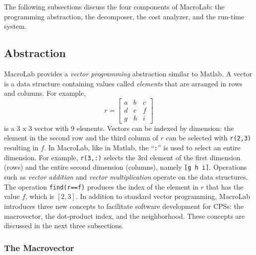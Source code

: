 The following subsections discuss the four components of MacroLab: the
programming abstraction, the decomposer, the cost analyzer, and the run-time
system.

\subsection{Abstraction} \label{sect:abstraction}

MacroLab provides a {\em vector programming} abstraction similar to Matlab. A
vector is a data structure containing values called {\em elements}
that are arranged in rows and columns.  For example,
\[ r = \left[ \begin{array}{ccc} a & b & c \\ d & e & f \\ g & h & i \end{array}
\right]\] is a 3 x 3 vector with 9 elements.  Vectors can be indexed by
dimension: the element in the second row and the third column of $r$ can be
selected with {\tt r(2,3)} resulting in $f$.  In MacroLab, like in Matlab, the
``{\tt :}'' is used to select an entire dimension.  For example, {\tt r(3,:)}
selects the 3rd element of the first dimension (rows) and the entire second
dimension (columns), namely {\tt [g~h~i]}.  Operations such as {\em vector
addition} and {\em vector multiplication} operate on the data structures. The
operation {\tt find(r==f)} produces the index of the element in $r$ that has the
value $f$, which is $[2,3]$.  In addition to standard vector programming,
MacroLab introduces three new concepts to facilitate software development for
CPSs: the macrovector, the dot-product index, and the neighborhood.  These
concepts are discussed in the next three subsections.


\subsubsection{The Macrovector}

